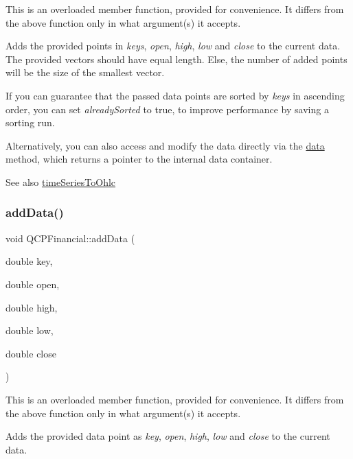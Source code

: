This is an overloaded member function, provided for convenience. It differs from the above function only in what argument(s) it accepts.

Adds the provided points in {\itshape keys}, {\itshape open}, {\itshape high}, {\itshape low} and {\itshape close} to the current data. The provided vectors should have equal length. Else, the number of added points will be the size of the smallest vector.

If you can guarantee that the passed data points are sorted by {\itshape keys} in ascending order, you can set {\itshape already\+Sorted} to true, to improve performance by saving a sorting run.

Alternatively, you can also access and modify the data directly via the \hyperlink{classQCPFinancial_aec3f666271cf48bd7b87d84fe3f8c074}{data} method, which returns a pointer to the internal data container.

\begin{DoxySeeAlso}{See also}
\hyperlink{classQCPFinancial_a9a058c035040d3939b8884f4aaccb1a7}{time\+Series\+To\+Ohlc} 
\end{DoxySeeAlso}
\mbox{\label{classQCPFinancial_a688bbd052e00a02954ddb0068b378170}} 
\subsubsection{\texorpdfstring{add\+Data()}{addData()}\hspace{0.1cm}{\footnotesize\ttfamily [2/2]}}
{\footnotesize\ttfamily void Q\+C\+P\+Financial\+::add\+Data (\begin{DoxyParamCaption}\item[{double}]{key,  }\item[{double}]{open,  }\item[{double}]{high,  }\item[{double}]{low,  }\item[{double}]{close }\end{DoxyParamCaption})}

This is an overloaded member function, provided for convenience. It differs from the above function only in what argument(s) it accepts.

Adds the provided data point as {\itshape key}, {\itshape open}, {\itshape high}, {\itshape low} and {\itshape close} to the current data.

